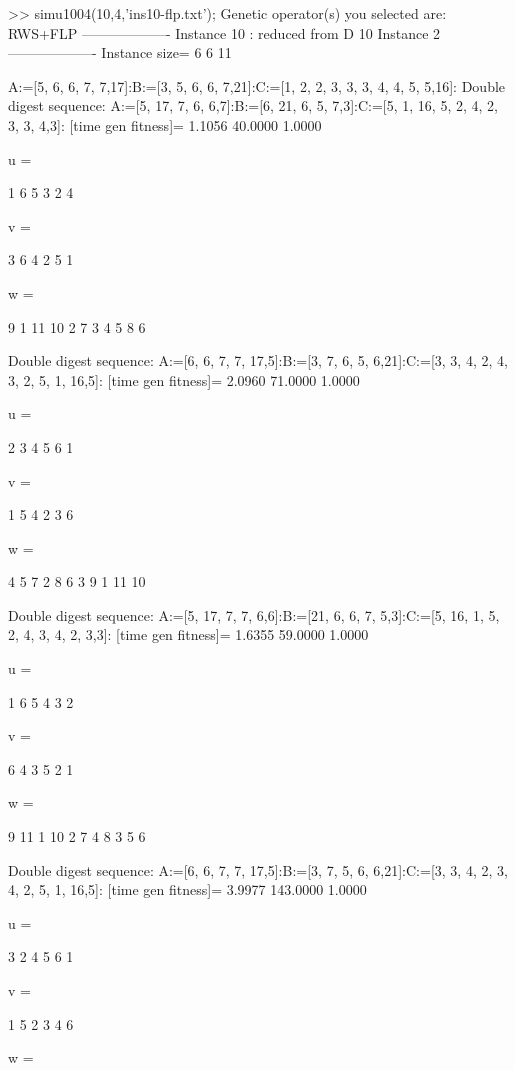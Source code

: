 >> simu1004(10,4,'ins10-flp.txt');
Genetic operator(s) you selected are:
RWS+FLP
------------------- Instance 10 : reduced from D 10 Instance 2 -------------------
Instance size=
     6     6    11

A:=[5, 6, 6, 7, 7,17]:B:=[3, 5, 6, 6, 7,21]:C:=[1, 2, 2, 3, 3, 3, 4, 4, 5, 5,16]:
Double digest sequence:
A:=[5, 17, 7, 6, 6,7]:B:=[6, 21, 6, 5, 7,3]:C:=[5, 1, 16, 5, 2, 4, 2, 3, 3, 4,3]:
[time gen fitness]=
    1.1056   40.0000    1.0000


u =

     1     6     5     3     2     4


v =

     3     6     4     2     5     1


w =

     9     1    11    10     2     7     3     4     5     8     6

Double digest sequence:
A:=[6, 6, 7, 7, 17,5]:B:=[3, 7, 6, 5, 6,21]:C:=[3, 3, 4, 2, 4, 3, 2, 5, 1, 16,5]:
[time gen fitness]=
    2.0960   71.0000    1.0000


u =

     2     3     4     5     6     1


v =

     1     5     4     2     3     6


w =

     4     5     7     2     8     6     3     9     1    11    10

Double digest sequence:
A:=[5, 17, 7, 7, 6,6]:B:=[21, 6, 6, 7, 5,3]:C:=[5, 16, 1, 5, 2, 4, 3, 4, 2, 3,3]:
[time gen fitness]=
    1.6355   59.0000    1.0000


u =

     1     6     5     4     3     2


v =

     6     4     3     5     2     1


w =

     9    11     1    10     2     7     4     8     3     5     6

Double digest sequence:
A:=[6, 6, 7, 7, 17,5]:B:=[3, 7, 5, 6, 6,21]:C:=[3, 3, 4, 2, 3, 4, 2, 5, 1, 16,5]:
[time gen fitness]=
    3.9977  143.0000    1.0000


u =

     3     2     4     5     6     1


v =

     1     5     2     3     4     6


w =

